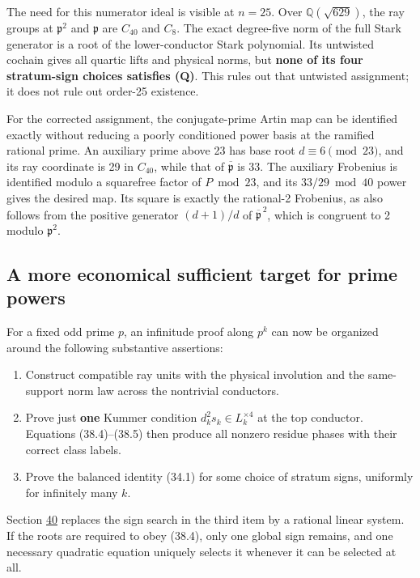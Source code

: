 \documentclass[11pt,reqno]{amsart}
\theoremstyle{plain}
\begin{document}
The need for this numerator ideal is visible at \(n=25\). Over
\(\mathbb Q(\sqrt{629})\), the ray groups at
\(\mathfrak p^2\) and \(\mathfrak p\) are \(C_{40}\) and
\(C_8\). The exact degree-five norm of the full Stark generator
is a root of the lower-conductor Stark polynomial. Its untwisted
cochain gives all quartic lifts and physical norms, but \textbf{none of its
four stratum-sign choices satisfies (Q)}. This rules out that
untwisted assignment; it does not rule out order-25 existence.

For the corrected assignment, the conjugate-prime Artin map can be
identified exactly without reducing a poorly conditioned power basis
at the ramified rational prime. An auxiliary prime above 23 has base
root \(d\equiv6\pmod{23}\), and its ray coordinate is 29 in
\(C_{40}\), while that of \(\overline{\mathfrak p}\) is 33.
The auxiliary Frobenius is identified modulo a squarefree factor of
\(P\bmod23\), and its \(33/29\bmod40\) power gives the desired
map. Its square is exactly the rational-2 Frobenius, as also follows
from the positive generator
\((d+1)/d\) of \(\overline{\mathfrak p}^{\,2}\), which is
congruent to 2 modulo \(\mathfrak p^2\).

\subsection{A more economical sufficient target for prime powers}\label{sec:38.4}

For a fixed odd prime \(p\), an infinitude proof along \(p^k\)
can now be organized around the following substantive assertions:

\begin{enumerate}
\item Construct compatible ray units with the physical involution and
the same-support norm law across the nontrivial conductors.
\item Prove just \textbf{one} Kummer condition \(d_k^2s_k\in L_k^{\times4}\)
at the top conductor. Equations (38.4)--(38.5) then produce all
nonzero residue phases with their correct class labels.
\item Prove the balanced identity (34.1) for some choice of stratum
signs, uniformly for infinitely many \(k\).
\end{enumerate}

Section \hyperref[sec:40]{40} replaces the sign search in the third item by a rational
linear system. If the roots are required to obey (38.4), only one
global sign remains, and one necessary quadratic equation uniquely
selects it whenever it can be selected at all.
\end{document}
